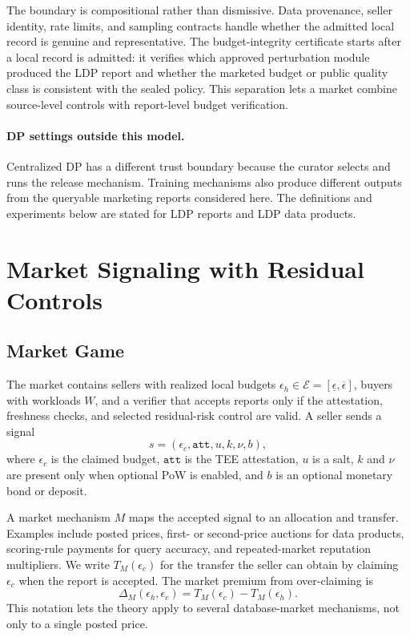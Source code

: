 \documentclass[conference]{IEEEtran}
\newcommand{\eps}{\epsilon}
\begin{document}
The boundary is compositional rather than dismissive. Data provenance, seller identity, rate limits, and sampling contracts handle whether the admitted local record is genuine and representative. The budget-integrity certificate starts after a local record is admitted: it verifies which approved perturbation module produced the LDP report and whether the marketed budget or public quality class is consistent with the sealed policy. This separation lets a market combine source-level controls with report-level budget verification.

\paragraph{DP settings outside this model.}
Centralized DP has a different trust boundary because the curator selects and runs the release mechanism. Training mechanisms also produce different outputs from the queryable marketing reports considered here. The definitions and experiments below are stated for LDP reports and LDP data products.

\section{Market Signaling with Residual Controls}
\label{sec:signaling}

\subsection{Market Game}

The market contains sellers with realized local budgets $\eps_h\in\mathcal{E}=[\underline{\eps},\overline{\eps}]$, buyers with workloads $W$, and a verifier that accepts reports only if the attestation, freshness checks, and selected residual-risk control are valid. A seller sends a signal
\[
s=(\eps_c,\texttt{att},u,k,\nu,b),
\]
where $\eps_c$ is the claimed budget, $\texttt{att}$ is the TEE attestation, $u$ is a salt, $k$ and $\nu$ are present only when optional PoW is enabled, and $b$ is an optional monetary bond or deposit.

A market mechanism $M$ maps the accepted signal to an allocation and transfer. Examples include posted prices, first- or second-price auctions for data products, scoring-rule payments for query accuracy, and repeated-market reputation multipliers. We write $T_M(\eps_c)$ for the transfer the seller can obtain by claiming $\eps_c$ when the report is accepted. The market premium from over-claiming is
\[
\Delta_M(\eps_h,\eps_c)=T_M(\eps_c)-T_M(\eps_h).
\]
This notation lets the theory apply to several database-market mechanisms, not only to a single posted price.
\end{document}
